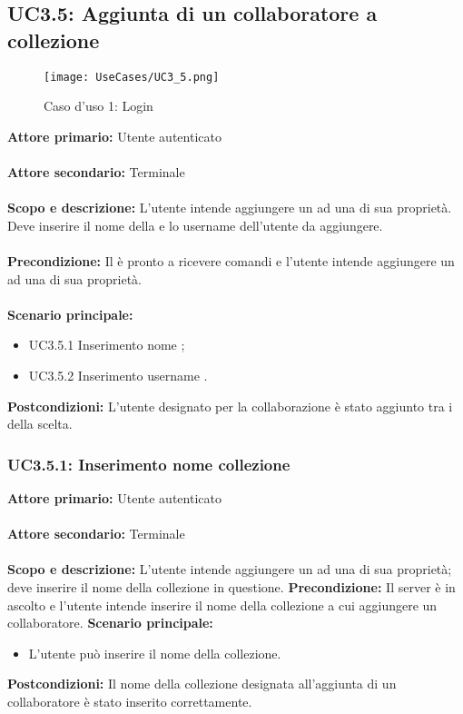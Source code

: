 \documentclass{scalatekids-article}
\begin{document}
\subsection{UC3.5: Aggiunta di un collaboratore a collezione}

\begin{figure}[H]
  \begin{center}
    \texttt{[image: UseCases/UC3\_5.png]}
    \caption*{Caso d'uso 1: Login}
  \end{center}
\end{figure}
\textbf{Attore primario:} Utente autenticato\\ \\
\textbf{Attore secondario:} Terminale\\ \\
\textbf{Scopo e descrizione:} L'utente intende aggiungere un  ad una  di sua proprietà. Deve inserire il nome della  e lo username dell'utente da aggiungere.\\ \\
\textbf{Precondizione:} Il  è pronto a ricevere comandi e l'utente intende aggiungere un  ad una  di sua proprietà.\\ \\
\textbf{Scenario principale:}
\begin{itemize}
\item UC3.5.1 Inserimento nome ;
\item UC3.5.2 Inserimento username .
\end{itemize}
\textbf{Postcondizioni:} L'utente designato per la collaborazione è stato aggiunto tra i  della  scelta.

\subsubsection{UC3.5.1: Inserimento nome collezione}

\textbf{Attore primario:} Utente autenticato\\ \\
\textbf{Attore secondario:} Terminale\\ \\
\textbf{Scopo e descrizione:} L'utente intende aggiungere un  ad una  di sua proprietà; deve inserire il nome della collezione in questione.
\textbf{Precondizione:} Il server è in ascolto e l'utente intende inserire il nome della collezione a cui aggiungere un collaboratore.
\textbf{Scenario principale:}
\begin{itemize}
\item L'utente può inserire il nome della collezione.
\end{itemize}
\textbf{Postcondizioni:} Il nome della collezione designata all'aggiunta di un collaboratore è stato inserito correttamente.
\end{document}
